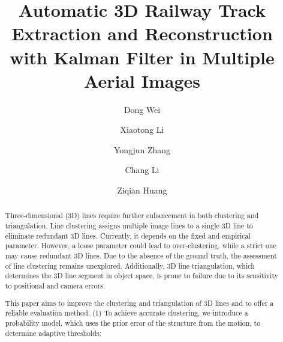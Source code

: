 \documentclass[a4paper]{cas-sc}
\begin{document}
\linenumbers
\let\WriteBookmarks\relax
\def\floatpagepagefraction{1}

\shorttitle{}

\title [mode = title]{Automatic 3D Railway Track Extraction and Reconstruction with Kalman Filter in Multiple Aerial Images}                      


%
\author[1]{Dong Wei}
\fnmark[1]
\author[1]{Xiaotong Li}
\fnmark[1]
\author[1]{Yongjun Zhang}
\cormark[1]
\author[2]{Chang Li}

\author[1]{Ziqian Huang}
\fnmark[1]







\begin{abstract}
Three-dimensional (3D) lines require further enhancement in both clustering and triangulation. 
Line clustering assigns multiple image lines to a single 3D line to eliminate redundant 3D lines.
Currently, it depends on the fixed and empirical parameter.
However,
a loose parameter could lead to over-clustering, 
while a strict one may cause redundant 3D lines. 
Due to the absence of the ground truth, 
the assessment of line clustering remains unexplored.
Additionally, 
3D line triangulation, 
which determines the 3D line segment in object space, 
is prone to failure due to its sensitivity to positional and camera errors.

\noindent This paper aims to improve the clustering and triangulation of 3D lines and to offer a reliable evaluation method. 
(1) To achieve accurate clustering, 
we introduce a probability model,
which uses the prior error of the structure from the motion,
to determine adaptive thresholds;
\end{abstract}
\end{document}

